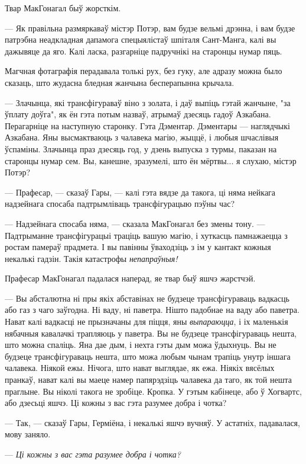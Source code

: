 Твар МакГонагал быў жорсткім.

--- Як правільна размяркаваў містэр Потэр, вам будзе вельмі дрэнна, і вам будзе 
патрэбна неадкладная дапамога спецыялістаў шпіталя Сант-Манга, калі вы дажывяце 
да яго. Калі ласка, разгарніце падручнікі на старонцы нумар пяць.

Магчная фотаграфія перадавала толькі рух, без гуку, але адразу можна было сказаць,
што жудасна бледная жанчына бесперапынна крычала.

--- Злачынца, які трансфігураваў віно з золата, і даў выпіць гэтай 
жанчыне, "за ўплату доўга", як ён гэта потым назваў, атрымаў дзесяць гадоў Азкабана.
Перагарніце на наступную старонку. Гэта Дэментар. Дэментары --- наглядчыкі Азкабана.
Яны высмактваюць з чалавека магію, жыццё, і любыя шчаслівыя ўспаміны. Злачынца 
праз дзесяць год, у дзень выпуска з турмы, паказан на старонцы нумар сем.
Вы, канешне, зразумелі, што ён мёртвы... я слухаю, містэр Потэр?

--- Прафесар, --- сказаў Гары, --- калі гэта вядзе да такога, ці няма 
нейкага надзейнага спосаба падтрымліваць трансфігурацыю пэўны час?

--- Надзейнага спосаба няма, --- сказала МакГонагал без змены тону. --- Падтрыманне
трансфігурацыі траціць вашую магію, і хуткасць памнажаецца з ростам памераў прадмета.
І вы павінны ўваходзіць з ім у кантакт кожныя некалькі гадзін. Такія катастрофы 
\emph{непапраўныя!}

Прафесар МакГонагал падалася наперад, яе твар быў яшчэ жарстчэй.

--- Вы абсталютна ні пры якіх абставінах не будзеце трансфігураваць 
вадкасць або газ з чаго заўгодна. Ні ваду, ні паветра. Нішто падобнае на ваду або паветра.
Нават калі вадкасці не прызначаны для піцця, яны \emph{выпараюцца}, і іх 
маленькія нябачныя кавалачкі трапляюць у паветра. Вы не будзеце трансфігураваць
нешта, што можна спаліць. Яна дае дым, і нехта гэты дым можа ўдыхнуць.
Вы не будзеце трансфігураваць нешта, што можа любым чынам трапіць унутр іншага чалавека.
Ніякой ежы. Нічога, што нават выглядае, як ежа.  Ніякіх вясёлых пранкаў,
нават калі вы маеце намер папярэдзіць чалавека да таго, як той нешта праглыне.
Вы ніколі такога не зробіце. Кропка. У гэтым кабінеце, або ў Хогвартс, або дзесьці яшчэ.
Ці кожны з вас гэта разумее добра і чотка?

--- Так, --- сказаў Гары, Герміёна, і некалькі яшчэ вучняў. У астатніх, падавалася,
мову заняло.

--- \emph{Ці кожны з вас гэта разумее добра і чотка?}

